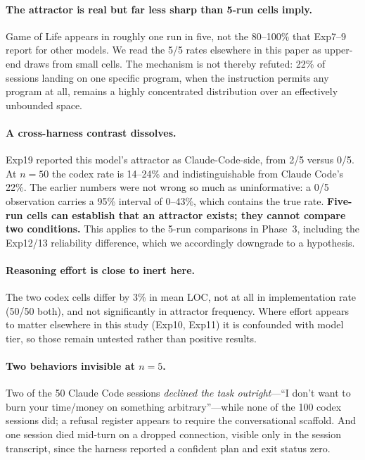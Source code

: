 \documentclass{article}
\begin{document}
\paragraph{The attractor is real but far less sharp than 5-run
cells imply.} Game of Life appears in roughly one run in five, not
the 80--100\% that Exp7--9 report for other models. We read the
5/5 rates elsewhere in this paper as upper-end draws from small
cells. The mechanism is not thereby refuted: 22\% of sessions
landing on one specific program, when the instruction permits any
program at all, remains a highly concentrated distribution over an
effectively unbounded space.

\paragraph{A cross-harness contrast dissolves.} Exp19 reported
this model's attractor as Claude-Code-side, from 2/5 versus 0/5.
At $n=50$ the codex rate is 14--24\% and indistinguishable from
Claude Code's 22\%. The earlier numbers were not wrong so much as
uninformative: a 0/5 observation carries a 95\% interval of
0--43\%, which contains the true rate. \textbf{Five-run cells can
establish that an attractor exists; they cannot compare two
conditions.} This applies to the 5-run comparisons in Phase~3,
including the Exp12/13 reliability difference, which we accordingly
downgrade to a hypothesis.

\paragraph{Reasoning effort is close to inert here.} The two codex
cells differ by 3\% in mean LOC, not at all in implementation rate
(50/50 both), and not significantly in attractor frequency. Where
effort appears to matter elsewhere in this study (Exp10, Exp11) it
is confounded with model tier, so those remain untested rather
than positive results.

\paragraph{Two behaviors invisible at $n=5$.} Two of the 50 Claude
Code sessions \emph{declined the task outright}---``I don't want to
burn your time/money on something arbitrary''---while none of the
100 codex sessions did; a refusal register appears to require the
conversational scaffold. And one session died mid-turn on a
dropped connection, visible only in the session transcript, since
the harness reported a confident plan and exit status zero.
\end{document}
